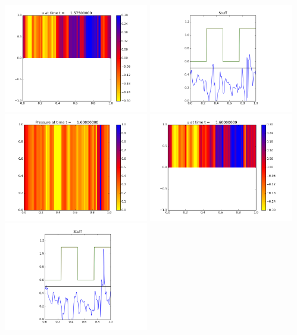 \documentclass[11pt]{article}
\begin{document}
\includegraphics[width=0.475\textwidth]{frame0063fig1.png}
\vskip 10pt 
\includegraphics[width=0.475\textwidth]{frame0063fig3.png}
\vskip 10pt 
\includegraphics[width=0.475\textwidth]{frame0064fig0.png}
\includegraphics[width=0.475\textwidth]{frame0064fig1.png}
\vskip 10pt 
\includegraphics[width=0.475\textwidth]{frame0064fig3.png}
\end{document}
